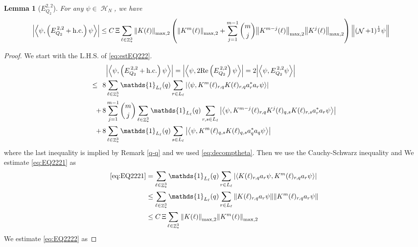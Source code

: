 \documentclass[sn-mathphys, Numbered ,a4paper]{sn-jnl}%
\DeclareMathOperator{\Z}{\mathbb{Z}}
\DeclareMathOperator{\HH}{\mathcal{H}}
\DeclareMathOperator{\NN}{\mathcal{N}}
\newcommand{\half}{\frac{1}{2}}
\newcommand{\eva}[1]{\left\langle #1 \right\rangle}
\theoremstyle{plain}
\newtheorem{lemma}[theorem]{Lemma}
\theoremstyle{definition}
\theoremstyle{remark}
\theoremstyle{plain}
\theoremstyle{definition}
\theoremstyle{remark}
\begin{document}
\begin{lemma}[$E_{Q_2}^{2,2}$]
For any $\psi \in \HH_N$, we have
\begin{align}
    \abs{\eva{\psi,\left(E^{\,2,2}_{Q_2}+\mathrm{h.c.}\right) \psi }}
    &\leq   C\,\Xi \sum\limits_{\ell \in \Z^3_*} \norm{K(\ell)}_{\mathrm{max,2}} \left(\norm{K^m(\ell)}_{\mathrm{max,2}} + \sum\limits_{j=1}^{m-1} {{m}\choose j} \norm{K^{m-j}(\ell)}_{\mathrm{max,2}} \norm{K^j(\ell)}_{\mathrm{max,2}} \right) \norm{(\NN+1)^\half \psi} \label{eq:estEQ222}
    \end{align}
\end{lemma}
\begin{proof}
We start with the L.H.S. of \eqref{eq:estEQ222}.
\begin{align}
	&\abs{\eva{\psi,\left(E^{\,2,2}_{Q_2}+\mathrm{h.c.}\right) \psi }} = \abs{\eva{\psi,2\mathrm{Re}\left(E^{\,2,2}_{Q_2}\right) \psi }} = 2\abs{\eva{\psi, E^{\,2,2}_{Q_2} \psi }}\nonumber\\
	\leq\,\;8& \sum\limits_{\ell \in \Z^3_*} \mathds{1}_{L_{\ell}}(q) \sum\limits_{r\in L_{\ell}} \abs{\eva{\psi, K^m(\ell)_{r,q} K(\ell)_{r,q} a^*_{r} a_{r} \psi }}\label{eq:EQ2221}\\
	+\,8& \sum\limits_{j=1}^{m-1} {{m}\choose j} \sum\limits_{\ell \in \Z^3_*}\mathds{1}_{L_{\ell}}(q) \sum\limits_{r,s\in L_{\ell}}  \abs{\eva{\psi,K^{m-j}(\ell)_{r,q} K^{j}(\ell)_{q,s} K(\ell)_{r,s} a^*_{r} a_{r}   \psi }}\label{eq:EQ2222}\\
	+\,8&\sum\limits_{\ell \in \Z^3_*} \mathds{1}_{L_{\ell}}(q) \sum\limits_{ s \in L_{\ell}} \abs{\eva{\psi, K^m(\ell)_{q,s} K(\ell)_{q,s} a^*_{q} a_{q} \psi }}\label{eq:EQ2223}
\end{align}
where the last inequality is implied by Remark \ref{q-q} and we used \eqref{eq:decomptheta}. Then we use the Cauchy-Schwarz inequality and We estimate \eqref{eq:EQ2221} as 
\begin{align}
	\eqref{eq:EQ2221}
	&= \sum\limits_{\ell \in \Z^3_*} \mathds{1}_{L_{\ell}}(q) \sum\limits_{r\in L_{\ell}} \abs{\eva{ K(\ell)_{r,q} a_{r} \psi, K^m(\ell)_{r,q}  a_{r} \psi }}\nonumber\\
	&\leq \sum\limits_{\ell \in \Z^3_*} \mathds{1}_{L_{\ell}}(q) \sum\limits_{r\in L_{\ell}} \norm{ K(\ell)_{r,q} a_{r} \psi}\norm{ K^m(\ell)_{r,q}  a_{r} \psi }\nonumber\\
	&\leq C\,\Xi\sum\limits_{\ell \in \Z^3_*} \norm{K(\ell)}_{\mathrm{max,2}} \norm{K^m(\ell)}_{\mathrm{max,2}} \label{eq:estEQ2221}
\end{align}
We estimate \eqref{eq:EQ2222} as

\end{proof}
\end{document}
